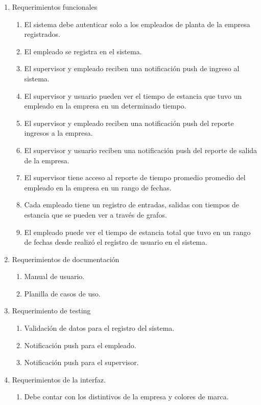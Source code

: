 \documentclass[
11pt, %
]{charter}
\begin{document}
\begin{enumerate}
	\item Requerimientos funcionales
		\begin{enumerate}
			\item El sistema debe autenticar solo a los empleados de planta de la empresa registrados.
			\item El empleado se registra en el sistema.
			\item El supervisor y empleado reciben una notificación push de ingreso al sistema.
			\item El supervisor y usuario pueden ver el tiempo de estancia que tuvo un empleado en la empresa en un determinado tiempo.
			\item El supervisor y empleado reciben una notificación push del reporte ingresos a la empresa.
			\item El supervisor y usuario reciben una notificación push del reporte de salida de la empresa.
			\item El supervisor tiene acceso al reporte de tiempo promedio promedio del empleado en la empresa en un rango de fechas. 
			\item Cada empleado tiene un registro de entradas, salidas con tiempos de estancia que se pueden ver a través de grafos.
			\item El empleado puede ver el tiempo de estancia total  que tuvo en un rango de fechas desde realizó el registro de usuario en el sistema.
		\end{enumerate}
	\item Requerimientos de documentación
		\begin{enumerate}
			\item Manual de usuario.
			\item Planilla de casos de uso.
		\end{enumerate}
	\item Requerimiento de testing
		\begin{enumerate}
			\item Validación de datos para el registro del sistema.
			\item Notificación push para el empleado.
			\item Notificación push para el supervisor.
		\end{enumerate}
	\item Requerimientos de la interfaz.
			\begin{enumerate}
			\item Debe contar con los distintivos de la empresa y colores de marca.

\end{enumerate}
\end{enumerate}
\end{document}
